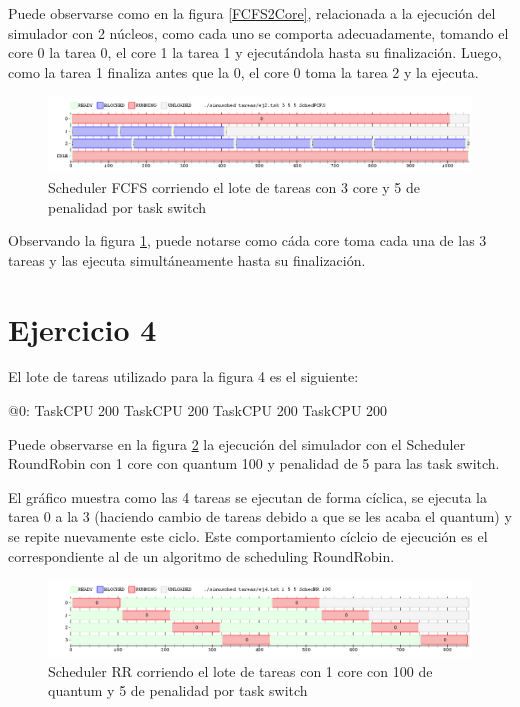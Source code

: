 \documentclass[a4paper,10pt,twoside]{article}
\newenvironment{pseudo}[1][]{%
    \vspace{0.5em}%
    \begin{algorithmic}%
}
{%
    \end{algorithmic}%
    \vspace{0.5em}%
}
\begin{document}
Puede observarse como en la figura \ref{FCFS2Core}, relacionada a la ejecución del simulador con 2 núcleos, como cada uno se comporta adecuadamente, tomando el core 0 la tarea 0, el core 1 la tarea 1 y ejecutándola hasta su finalización. Luego, como la tarea 1 finaliza antes que la 0, el core 0 toma la tarea 2 y la ejecuta.

\begin{figure}[ht!]
\centering
\includegraphics[width=175mm]{../ejercicio2/FCFS3Core.png}
\caption{Scheduler FCFS corriendo el lote de tareas con 3 core y 5 de penalidad por task switch}
\label{FCFS3Core}
\end{figure}

Observando la figura \ref{FCFS3Core}, puede notarse como cáda core toma cada una de las 3 tareas y las ejecuta simultáneamente hasta su finalización.



\section{Ejercicio 4}
El lote de tareas utilizado para la figura 4 es el siguiente:
\begin{pseudo}
	\State @0:
	\State TaskCPU 200
	\State TaskCPU 200
	\State TaskCPU 200
	\State TaskCPU 200
\end{pseudo}

Puede observarse en la figura \ref{SchedRR1Core} la ejecución del simulador con el Scheduler RoundRobin con 1 core con quantum 100 y penalidad de 5 para las task switch.

El gráfico muestra como las 4 tareas se ejecutan de forma cíclica, se ejecuta la tarea 0 a la 3 (haciendo cambio de tareas debido a que se les acaba el quantum) y se repite nuevamente este ciclo. Este comportamiento cíclcio de ejecución es el correspondiente al de un algoritmo de scheduling RoundRobin.

\begin{figure}[ht!]
\centering
\includegraphics[width=175mm]{../ejercicio4/SchedRR1Core.png}
\caption{Scheduler RR corriendo el lote de tareas con 1 core con 100 de quantum y 5 de penalidad por task switch}
\label{SchedRR1Core}
\end{figure}
\end{document}
